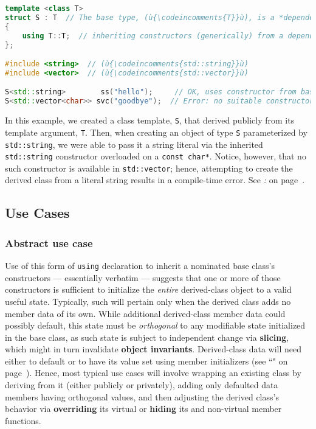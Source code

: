 \begin{lstlisting}[language=C++]
template <class T>
struct S : T  // The base type, (ù{\codeincomments{T}}ù), is a *dependent type*.
{
    using T::T;  // inheriting constructors (generically) from a dependent type
};

#include <string>  // (ù{\codeincomments{std::string}}ù)
#include <vector>  // (ù{\codeincomments{std::vector}}ù)

S<std::string>        ss("hello");     // OK, uses constructor from base
S<std::vector<char>> svc("goodbye");  // Error: no suitable constructor in base
\end{lstlisting}

\noindent In this example, we created a class template, \texttt{S}, that
derived publicly from its template argument, \texttt{T}. Then, when
creating an object of type \texttt{S} parameterized by
\texttt{std::string}, we were able to pass it a string literal via
the inherited \texttt{std::string} constructor overloaded on a
\texttt{const}~\texttt{char*}. Notice, however, that no such constructor
is available in \texttt{std::vector}; hence, attempting to create the
derived class from a literal string results in a compile-time error. See \textit{: } on page~\pageref{incorporating-reusable-functionality-via-a-mix-in-class}.

\subsection[Use Cases]{Use Cases}\label{use-cases-ctorinheriting}

\subsubsection[Abstract use case]{Abstract use case}\label{abstract-use-case}

Use of this form of \texttt{using} declaration to inherit a nominated
base class's constructors --- essentially verbatim --- suggests that one
or more of those constructors is sufficient to initialize the
\emph{entire} derived-class object to a valid useful state. Typically,
such will pertain only when the derived class adds no member data of its
own. While additional derived-class member data could possibly
default, this state must be \emph{orthogonal} to
any modifiable state initialized in the base class, as such state is
subject to independent change via \textbf{slicing}, which might in turn
invalidate \textbf{object invariants}. Derived-class data will need either
to default or to have its value set using member
initializers (see ``" on page~\pageref{Default-Member-Initializers}). Hence, most typical use cases will involve wrapping an
existing class by deriving from it (either publicly or privately),
adding only defaulted data members having orthogonal values, and then
adjusting the derived class's behavior via \textbf{overriding} its virtual
or \textbf{hiding} its and non-virtual member functions.

